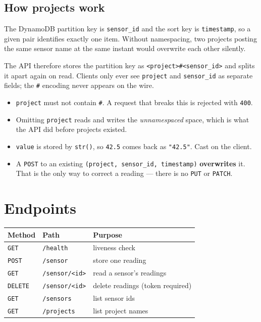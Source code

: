 \documentclass[11pt,a4paper]{article}
\begin{document}
\subsection{How projects work}

\label{sec:projects}
The DynamoDB partition key is \texttt{sensor\_id} and the sort key is
\texttt{timestamp}, so a given pair identifies exactly one item. Without
namespacing, two projects posting the same sensor name at the same instant
would overwrite each other silently.

The API therefore stores the partition key as
\texttt{<project>\#<sensor\_id>} and splits it apart again on read. Clients
only ever see \texttt{project} and \texttt{sensor\_id} as separate fields;
the \texttt{\#} encoding never appears on the wire.

\begin{itemize}[leftmargin=*]
  \item \texttt{project} must not contain \texttt{\#}. A request that
        breaks this is rejected with \texttt{400}.
  \item Omitting \texttt{project} reads and writes the \emph{unnamespaced}
        space, which is what the API did before projects existed.
  \item \texttt{value} is stored by \texttt{str()}, so \texttt{42.5} comes
        back as \texttt{"42.5"}. Cast on the client.
  \item A \texttt{POST} to an existing \texttt{(project, sensor\_id,
        timestamp)} \textbf{overwrites} it. That is the only way to correct
        a reading --- there is no \texttt{PUT} or \texttt{PATCH}.
\end{itemize}

\section{Endpoints}

\begin{center}
\begin{tabular}{@{}lll@{}}
\toprule
Method & Path & Purpose \\
\midrule
\texttt{GET}    & \texttt{/health}            & liveness check \\
\texttt{POST}   & \texttt{/sensor}            & store one reading \\
\texttt{GET}    & \texttt{/sensor/<id>}       & read a sensor's readings \\
\texttt{DELETE} & \texttt{/sensor/<id>}       & delete readings (token required) \\
\texttt{GET}    & \texttt{/sensors}           & list sensor ids \\
\texttt{GET}    & \texttt{/projects}          & list project names \\
\bottomrule
\end{tabular}
\end{center}
\end{document}
